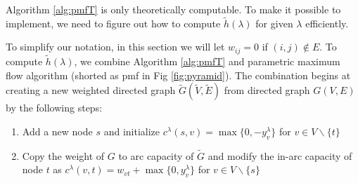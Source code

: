 \documentclass{article}
\begin{document}
Algorithm \ref{alg:pmfT} is only theoretically computable. To make it possible to implement, we need to figure out how to compute $\tilde{h}(\lambda)$ for given $\lambda$ efficiently.

To simplify our notation, in this section we will let $w_{ij} = 0$ if $(i,j) \not\in E$. To compute $\tilde{h}(\lambda)$, we combine Algorithm \ref{alg:pmfT} and parametric maximum flow algorithm (shorted as pmf in Fig \ref{fig:pyramid}). The combination begins at creating a new weighted directed graph $\widetilde{G}(\widetilde{V}, \widetilde{E})$ from directed graph $G(V,E)$ by the following steps:
\begin{enumerate}
	\item Add a new node $s$ and initialize $c^{\lambda}(s,v)=\max\{0, -y^{\lambda}_v\}$ for $v \in V\backslash \{t\}$
	\item Copy the weight of $G$ to arc capacity of $\widetilde{G}$ and modify the in-arc capacity of node $t$ as $c^{\lambda}(v,t) = w_{vt} + \max\{0, y^{\lambda}_v\}$ for $ v \in V\backslash \{s\}$
	\end{enumerate}
\end{document}
